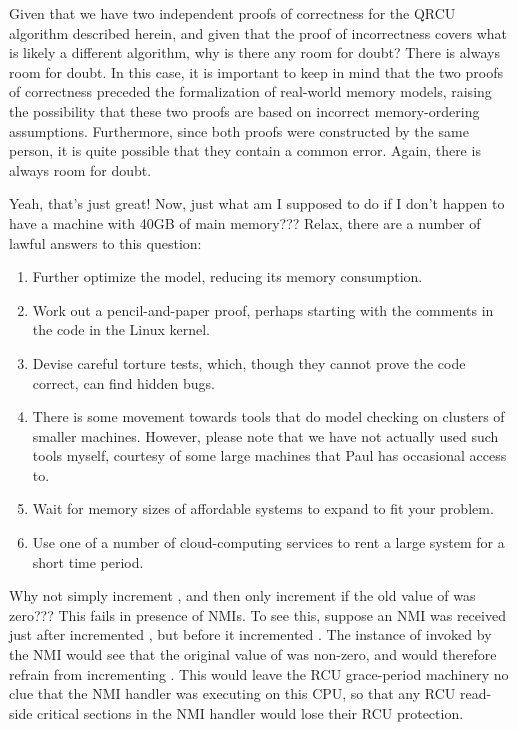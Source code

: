 \begin{enumerate}
\QuickQ{}
	Given that we have two independent proofs of correctness for
	the QRCU algorithm described herein, and given that the
	proof of incorrectness covers what is likely a different
	algorithm, why is there any room for doubt?
\QuickA{}
	There is always room for doubt.
	In this case, it is important to keep in mind that the two proofs
	of correctness preceded the formalization of real-world memory
	models, raising the possibility that these two proofs are based
	on incorrect memory-ordering assumptions.
	Furthermore, since both proofs were constructed by the same person,
	it is quite possible that they contain a common error.
	Again, there is always room for doubt.

\QuickQ{}
	Yeah, that's just great!
	Now, just what am I supposed to do if I don't happen to have a
	machine with 40GB of main memory???
\QuickA{}
	Relax, there are a number of lawful answers to
	this question:
	\begin{enumerate}
	\item	Further optimize the model, reducing its memory consumption.
	\item	Work out a pencil-and-paper proof, perhaps starting with the
		comments in the code in the Linux kernel.
	\item	Devise careful torture tests, which, though they cannot prove
		the code correct, can find hidden bugs.
	\item	There is some movement towards tools that do model
		checking on clusters of smaller machines.
		However, please note that we have not actually used such
		tools myself, courtesy of some large machines that Paul has
		occasional access to.
	\item	Wait for memory sizes of affordable systems to expand
		to fit your problem.
	\item	Use one of a number of cloud-computing services to rent
		a large system for a short time period.
	\end{enumerate}

\QuickQ{}
	Why not simply increment , and then only
	increment  if the old value
	of  was zero???
\QuickA{}
	This fails in presence of NMIs.
	To see this, suppose an NMI was received just after
	 incremented ,
	but before it incremented .
	The instance of  invoked by the NMI
	would see that the original value of 
	was non-zero, and would therefore refrain from incrementing
	.
	This would leave the RCU grace-period machinery no clue that the
	NMI handler was executing on this CPU, so that any RCU read-side
	critical sections in the NMI handler would lose their RCU protection.


\end{enumerate}
